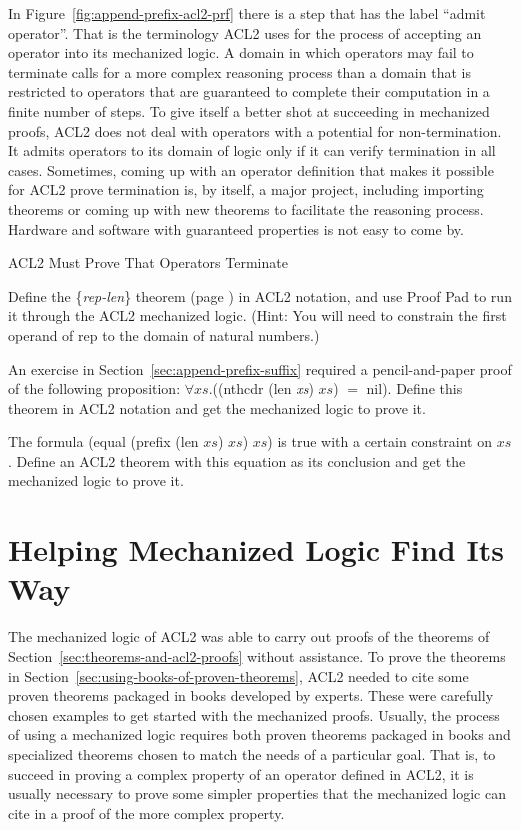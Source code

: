 \begin{aside}
In Figure~\ref{fig:append-prefix-acl2-prf}
there is a step that has the label ``admit operator''.
That is the terminology ACL2 uses for the process of accepting
an operator into its mechanized logic.
A domain in which operators may fail to terminate
calls for a more complex reasoning process than a domain that is
restricted to operators that are guaranteed to complete their
computation in a finite number of steps.
To give itself a better shot at succeeding in mechanized proofs,
ACL2 does not deal with operators with a potential for non-termination.
It admits operators to its domain of logic
only if it can verify termination in all cases.
Sometimes, coming up with an operator definition that makes
it possible for ACL2 prove termination is, by itself,
a major project, including importing theorems or coming up with new
theorems to facilitate the reasoning process.
Hardware and software with guaranteed properties is not easy to come by.
\caption{ACL2 Must Prove That Operators Terminate}
\label{reason-for-acl2-admit}
\end{aside}

\begin{ExerciseList}

\Exercise Define the \{\emph{rep-len}\} theorem (page \pageref{rep-len}) in ACL2 notation,
and use Proof Pad to run it through the ACL2 mechanized logic.
(Hint: You will need to constrain the first operand of rep to the domain of natural numbers.)

\Exercise An exercise in Section~\ref{sec:append-prefix-suffix} required a pencil-and-paper
proof of the following proposition: $\forall xs.$((nthcdr (len \emph{xs}) $xs$) $=$ nil).
Define this theorem in ACL2 notation and get the mechanized logic to prove it.

\Exercise The formula (equal (prefix (len $xs$) $xs$) $xs$) is true with a certain
constraint on $xs$. Define an ACL2 theorem with this equation as its conclusion
and get the mechanized logic to prove it.

\end{ExerciseList}

\section{Helping Mechanized Logic Find Its Way}
\label{sec:lemmas}

The mechanized logic of ACL2 was able to carry out proofs of
the theorems of Section~\ref{sec:theorems-and-acl2-proofs} without assistance.
To prove the theorems in Section~\ref{sec:using-books-of-proven-theorems},
ACL2 needed to cite some proven theorems packaged in books
developed by experts.
These were carefully chosen examples to get started with
the mechanized proofs.
Usually, the process of using a mechanized logic requires
both proven theorems packaged in books
and specialized theorems chosen to match the
needs of a particular goal.
That is, to succeed in proving a complex property of
an operator defined in ACL2,
it is usually necessary to prove
some simpler properties that the mechanized
logic can cite in a proof of the more complex property.


